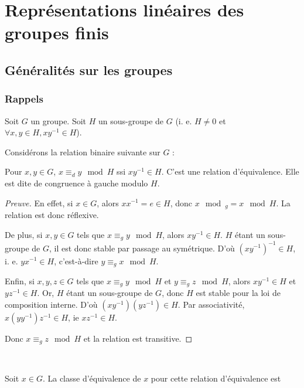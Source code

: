 \documentclass[french]{book}
\title{\bsc{Théorie des représentations}}
\date{2023-2024}
\author{Yves \bsc{Aubry}\\ Bureau : M-147A \\ \href{yves.aubry@univ-tln.fr}{yves.aubry@univ-tln.fr}\\Joachim \bsc{Asch}}
\theoremstyle{definition}
\begin{document}
\maketitle

\tableofcontents

\part{Représentations linéaires des groupes finis}

\chapter{Généralités sur les groupes}

\section{Rappels}


Soit $G$ un groupe. Soit $H$ un sous-groupe de $G$ (i. e. $H \neq 0$ et $\forall x, y \in H, x y ^{-1} \in H$).

Considérons la relation binaire suivante sur $G$ :

Pour $x, y \in G$, $x \equiv _{d} y \mod H$ ssi $x y ^{-1} \in H$. C'est une relation d'équivalence. Elle est dite de congruence à gauche modulo $H$.

\begin{proof}[Preuve]
  En effet, si $x \in G$, alors $x x ^{-1} = e \in H$, donc $x \mod _{g} = x \mod H$. La relation est donc réflexive.

  De plus, si $x, y \in G$ tels que $x \equiv _{g} y \mod H$, alors $x y ^{-1} \in H$. $H$ étant un sous-groupe de $G$, il est donc stable par passage au symétrique. D'où $(x y ^{-1} ) ^{-1}  \in H$, i. e. $y x ^{-1} \in H$, c'est-à-dire $y \equiv _{g} x \mod H$.

  Enfin, si $x, y,z \in G$ tels que $x \equiv _{g} y \mod H$ et $y \equiv _{g} z \mod H$, alors $x y ^{-1} \in H$ et $yz ^{-1} \in H$. Or, $H$ étant un sous-groupe de $G$, donc $H$ est stable pour la loi de composition interne. D'où $(x y ^{-1} )(y z ^{-1} ) \in H$. Par associativité, $x (y y ^{-1} ) z ^{-1}  \in H$, ie $x z ^{-1}  \in H$.

  Donc $x \equiv _{g} z \mod H $ et la relation est transitive.
\end{proof}

\

Soit $x \in G$. La classe d'équivalence de $x$ pour cette relation d'équivalence est
\end{document}
